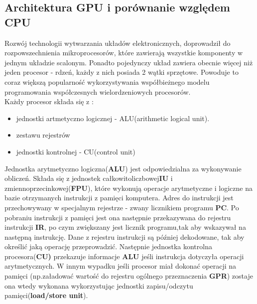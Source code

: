 \documentclass[document.tex]{subfiles}
\begin{document}
\subsection{Architektura GPU i porównanie względem CPU}


\indent Rozwój technologii wytwarzania układów elektronicznych, doprowadził do 
rozpowszechnienia mikroprocesorów, które zawierają wszystkie komponenty w jednym
układzie scalonym. Ponadto pojedynczy układ zawiera obecnie więcej niż jeden procesor - rdzeń, każdy z nich posiada 2
wątki sprzętowe. Powoduje to coraz większą popularność wykorzystywania współbieżnego modelu programowania współczesnych wielordzeniowych procesorów.\cite{OS_Stallings}
\cite{Computer_Architecture_Patterson_Hennesy}
\\
\indent Każdy procesor składa się z :
\begin{itemize}
\item jednostki artmetyczno logicznej - ALU(arithmetic logical unit).
\item zestawu rejestrów
\item jednostki kontrolnej - CU(control unit)
\end{itemize}


Jednostka arytmetyczno logiczna(\textbf{ALU})
jest odpowiedzialna za wykonywanie obliczeń. Składa się z jednostek całkowitoliczbowej\textbf{IU} i zmiennoprzecinkowej(\textbf{FPU}), które wykonują operacje arytmetyczne i logiczne  na bazie otrzymanych instrukcji z pamięci komputera. Adres do instrukcji jest przechowywany w specjalnym rejestrze - zwany licznikiem programu \textbf{PC}. Po pobraniu instrukcji z pamięci jest ona następnie przekazywana do rejestru instrukcji \textbf{IR}, po czym zwiększany jest licznik programu,tak aby wskazywał na następną instrukcję.
Dane z rejestru instrukcji są później dekodowane, tak aby
określić jaką operację przeprowadzić. Następnie jednostka kontrolna procesora(\textbf{CU)} przekazuje informacje \textbf{ALU} jeśli instrukcja dotyczyła operacji arytmetycznych.
W innym wypadku jeśli procesor miał dokonać operacji na pamięci
(np.załadować wartość do rejestru ogólnego przeznaczenia \textbf{GPR}) zostaje ona wtedy wykonana wykorzystując 
jednostki zapisu/odczytu pamięci(\textbf{load/store unit}).
\cite{OS_Stallings}\cite{Inside_Machine}
\end{document}
